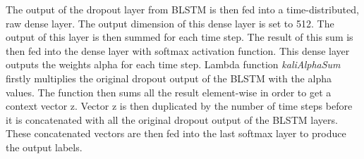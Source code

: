 The output of the dropout layer from BLSTM is then fed into a time-distributed, raw dense layer. The output dimension of this dense layer is set to 512. The output of this layer is then summed for each time step. The result of this sum is then fed into the dense layer with softmax activation function. This dense layer outputs the weights alpha for each time step. Lambda function \textit{kaliAlphaSum} firstly multiplies the original dropout output of the BLSTM with the alpha values. The function then sums all the result element-wise in order to get a context vector z. Vector z is then duplicated by the number of time steps before it is concatenated with all the original dropout output of the BLSTM layers. These concatenated vectors are then fed into the last softmax layer to produce the output labels.

%

